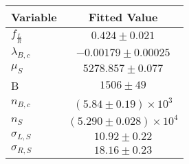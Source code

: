 \begin{tabular}[t]{lc}
\hline
Variable &Fitted Value\\
\hline\hline
$f_{\frac{L}{R}}$&$0.424\pm0.021$\\
\hline
$\lambda_{B,c}$&$-0.00179\pm0.00025$\\
\hline
$\mu_S$&$5278.857\pm0.077$\\
\hline
B&$1506\pm49$\\
\hline
$n_{B,c}$&$(5.84\pm0.19)\times 10^3$\\
\hline
$n_S$&$(5.290\pm0.028)\times 10^4$\\
\hline
$\sigma_{L, S}$&$10.92\pm0.22$\\
\hline
$\sigma_{R, S}$&$18.16\pm0.23$\\
\hline
\end{tabular}